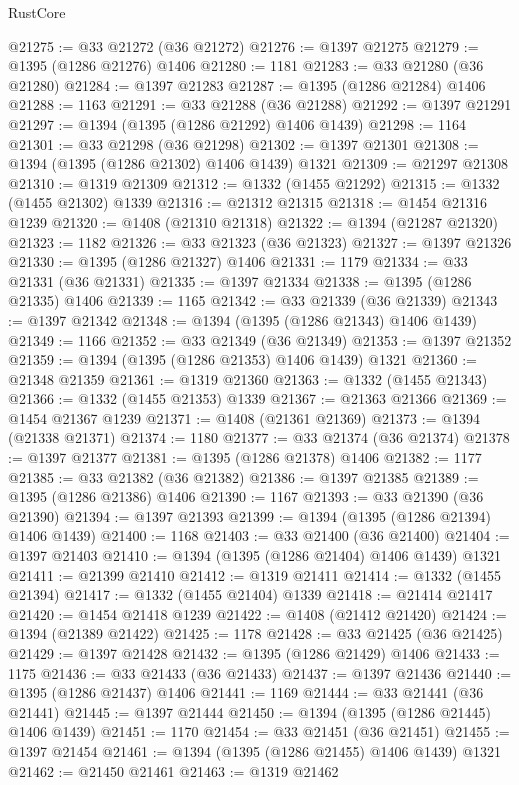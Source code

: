 \begin{lexlean}{RustCore}
\begin{coremodule}
@21275 := @33 @21272 (@36 @21272)
@21276 := @1397 @21275
@21279 := @1395 (@1286 @21276) @1406
@21280 := 1181
@21283 := @33 @21280 (@36 @21280)
@21284 := @1397 @21283
@21287 := @1395 (@1286 @21284) @1406
@21288 := 1163
@21291 := @33 @21288 (@36 @21288)
@21292 := @1397 @21291
@21297 := @1394 (@1395 (@1286 @21292) @1406 @1439)
@21298 := 1164
@21301 := @33 @21298 (@36 @21298)
@21302 := @1397 @21301
@21308 := @1394 (@1395 (@1286 @21302) @1406 @1439) @1321
@21309 := @21297 @21308
@21310 := @1319 @21309
@21312 := @1332 (@1455 @21292)
@21315 := @1332 (@1455 @21302) @1339
@21316 := @21312 @21315
@21318 := @1454 @21316 @1239
@21320 := @1408 (@21310 @21318)
@21322 := @1394 (@21287 @21320)
@21323 := 1182
@21326 := @33 @21323 (@36 @21323)
@21327 := @1397 @21326
@21330 := @1395 (@1286 @21327) @1406
@21331 := 1179
@21334 := @33 @21331 (@36 @21331)
@21335 := @1397 @21334
@21338 := @1395 (@1286 @21335) @1406
@21339 := 1165
@21342 := @33 @21339 (@36 @21339)
@21343 := @1397 @21342
@21348 := @1394 (@1395 (@1286 @21343) @1406 @1439)
@21349 := 1166
@21352 := @33 @21349 (@36 @21349)
@21353 := @1397 @21352
@21359 := @1394 (@1395 (@1286 @21353) @1406 @1439) @1321
@21360 := @21348 @21359
@21361 := @1319 @21360
@21363 := @1332 (@1455 @21343)
@21366 := @1332 (@1455 @21353) @1339
@21367 := @21363 @21366
@21369 := @1454 @21367 @1239
@21371 := @1408 (@21361 @21369)
@21373 := @1394 (@21338 @21371)
@21374 := 1180
@21377 := @33 @21374 (@36 @21374)
@21378 := @1397 @21377
@21381 := @1395 (@1286 @21378) @1406
@21382 := 1177
@21385 := @33 @21382 (@36 @21382)
@21386 := @1397 @21385
@21389 := @1395 (@1286 @21386) @1406
@21390 := 1167
@21393 := @33 @21390 (@36 @21390)
@21394 := @1397 @21393
@21399 := @1394 (@1395 (@1286 @21394) @1406 @1439)
@21400 := 1168
@21403 := @33 @21400 (@36 @21400)
@21404 := @1397 @21403
@21410 := @1394 (@1395 (@1286 @21404) @1406 @1439) @1321
@21411 := @21399 @21410
@21412 := @1319 @21411
@21414 := @1332 (@1455 @21394)
@21417 := @1332 (@1455 @21404) @1339
@21418 := @21414 @21417
@21420 := @1454 @21418 @1239
@21422 := @1408 (@21412 @21420)
@21424 := @1394 (@21389 @21422)
@21425 := 1178
@21428 := @33 @21425 (@36 @21425)
@21429 := @1397 @21428
@21432 := @1395 (@1286 @21429) @1406
@21433 := 1175
@21436 := @33 @21433 (@36 @21433)
@21437 := @1397 @21436
@21440 := @1395 (@1286 @21437) @1406
@21441 := 1169
@21444 := @33 @21441 (@36 @21441)
@21445 := @1397 @21444
@21450 := @1394 (@1395 (@1286 @21445) @1406 @1439)
@21451 := 1170
@21454 := @33 @21451 (@36 @21451)
@21455 := @1397 @21454
@21461 := @1394 (@1395 (@1286 @21455) @1406 @1439) @1321
@21462 := @21450 @21461
@21463 := @1319 @21462

\end{coremodule}
\end{lexlean}
